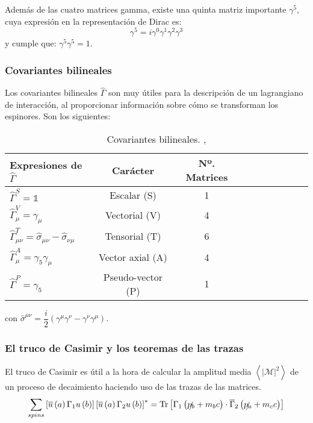 Además de las cuatro matrices gamma, existe una quinta matriz importante $\gamma^5$, cuya expresión en la representación de Dirac es:
\begin{equation}
\gamma^5 = i \gamma^0 \gamma^1 \gamma^2 \gamma^3\label{eq:gamma5}
\end{equation}
y cumple que: $\gamma^5 \gamma^5 = 1$.

\subsubsection{Covariantes bilineales}\label{sec:bilinearcov}
Los covariantes bilineales $\widehat{\Gamma}$ son muy útiles para la descripción de un lagrangiano de interacción, al proporcionar información sobre cómo se transforman los espinores. Son los siguientes:

\begin{table}[h]
	\centering
	\begin{tabular}{l*{8}{c}r}
\hline
Expresiones de $\widehat{\Gamma}$  & Carácter & Nº. Matrices\\ 
\hline
$\widehat{\Gamma}^{S} = \mathbb{1}$ & Escalar (S) & 1\\
$\widehat{\Gamma}_{\mu}^{V} = \gamma_{\mu}$ & Vectorial (V) & 4 &\\
$\widehat{\Gamma}^{T}_{\mu\nu} = \hat{\sigma}_{\mu\nu}-\hat{\sigma}_{\nu\mu}$ & Tensorial (T) & 6\\
$\widehat{\Gamma}_{\mu}^{A} = \gamma_{5}\gamma_{\mu}$ & Vector axial (A) & 4\\
$\widehat{\Gamma}^{P} = \gamma_{5}$ & Pseudo-vector (P) & 1\\
\hline
	\end{tabular}
\caption[Covariantes bilineales]{Covariantes bilineales. \cite{MCR}, \cite{GreinerRQM}}
\label{tab:bilinear_covariant}
\end{table}

con $\hat{\sigma}^{\mu\nu}= \dfrac{i}{2} \left(\gamma^{\mu}\gamma^{\nu} - \gamma^{\nu}\gamma^{\mu} \right)$.

\subsubsection{El truco de Casimir y los teoremas de las trazas}\label{sec:trazas}
El truco de Casimir es útil a la hora de calcular la amplitud media $\left\langle|\mathcal{M}|^2\right\rangle$ de un proceso de decaimiento haciendo uso de las trazas de las matrices.
\begin{equation}
\sum _{spins}\left[ \overline{u}\left( a\right) \Gamma_{1}u\left( b\right) \right] \left[ \overline{u}\left( a\right) \Gamma _{2}u\left( b\right) \right] ^{\ast }= \operatorname{Tr}\left[ \Gamma _{1}\left( \slashed{p_{b}}+m_{b}c\right) \cdot \overline{\Gamma }_{2}\left( \slashed{p_{a}}+m_{c}c\right) \right]\label{eq:casimir_trick}
\end{equation}

